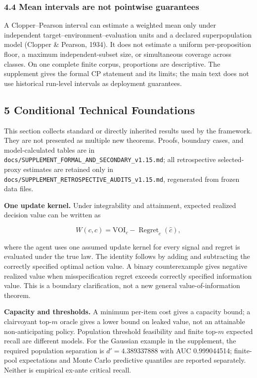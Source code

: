 \documentclass[
  11pt]{article}
\begin{document}
\subsubsection{4.4 Mean intervals are not pointwise
guarantees}\label{mean-intervals-are-not-pointwise-guarantees}

A Clopper--Pearson interval can estimate a weighted mean only under
independent target--environment--evaluation units and a declared
superpopulation model (Clopper \& Pearson, 1934). It does not estimate a
uniform per-proposition floor, a maximum independent-subset size, or
simultaneous coverage across classes. On one complete finite corpus,
proportions are descriptive. The supplement gives the formal CP
statement and its limits; the main text does not use historical
run-level intervals as deployment guarantees.

\subsection{5 Conditional Technical
Foundations}\label{conditional-technical-foundations}

This section collects standard or directly inherited results used by the
framework. They are not presented as multiple new theorems. Proofs,
boundary cases, and model-calculated tables are in
\texttt{docs/SUPPLEMENT\_FORMAL\_AND\_SECONDARY\_v1.15.md}; all
retrospective selected-proxy estimates are retained only in
\texttt{docs/SUPPLEMENT\_RETROSPECTIVE\_AUDITS\_v1.15.md}, regenerated
from frozen data files.

\textbf{One update kernel.} Under integrability and attainment, expected
realized decision value can be written as

\[W(c,\hat c)=\mathrm{VOI}_c-\operatorname{Regret}_c(\hat c),\tag{7}\]

where the agent uses one assumed update kernel for every signal and
regret is evaluated under the true law. The identity follows by adding
and subtracting the correctly specified optimal action value. A binary
counterexample gives negative realized value when misspecification
regret exceeds correctly specified information value. This is a boundary
clarification, not a new general value-of-information theorem.

\textbf{Capacity and thresholds.} A minimum per-item cost gives a
capacity bound; a clairvoyant top-\(m\) oracle gives a lower bound on
leaked value, not an attainable non-anticipating policy. Population
threshold feasibility and finite top-\(m\) expected recall are different
models. For the Gaussian example in the supplement, the required
population separation is \(d'=4.389337888\) with AUC 0.999044514;
finite-pool expectations and Monte Carlo predictive quantiles are
reported separately. Neither is empirical ex-ante critical recall.
\end{document}
